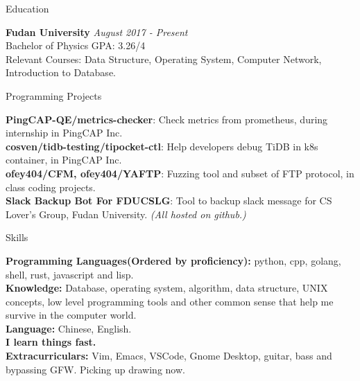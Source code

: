 \documentclass{resume} %
\begin{document}
\begin{rSection}{Education}

{\bf Fudan University} \hfill {\em August 2017 - Present} 
\\ Bachelor of Physics \hfill { GPA: 3.26/4}
\\ Relevant Courses: Data Structure, Operating System, Computer Network, Introduction to Database.

\end{rSection}



\begin{rSection}{Programming Projects }

{\bf PingCAP-QE/metrics-checker}: Check metrics from prometheus, during internship in PingCAP Inc.
\\ {\bf cosven/tidb-testing/tipocket-ctl}: Help developers debug TiDB in k8s container, in PingCAP Inc. 
\\ {\bf ofey404/CFM, ofey404/YAFTP}: Fuzzing tool and subset of FTP protocol, in class coding projects.
\\ {\bf Slack Backup Bot For FDUCSLG}: Tool to backup slack message for CS Lover's Group, Fudan University.
{\em (All hosted on github.)}

\end{rSection}



\begin{rSection}{Skills}

{\bf Programming Languages(Ordered by proficiency):} python, cpp, golang, shell, rust, javascript and lisp.
\\ {\bf Knowledge:} Database, operating system, algorithm, data structure, UNIX concepts, low level programming tools and other common sense that help me survive in the computer world.
\\ {\bf Language:} Chinese, English.
\\ {\bf I learn things fast.}
\\ {\bf Extracurriculars:} Vim, Emacs, VSCode, Gnome Desktop, guitar, bass and bypassing GFW. Picking up drawing now.

\end{rSection}
\end{document}

